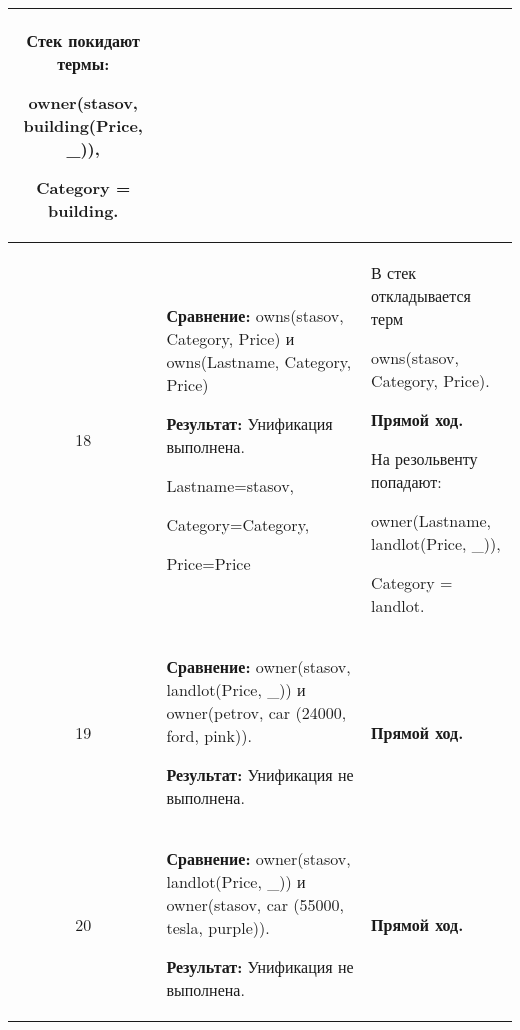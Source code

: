 \begin{longtable}{|c|p{}|p{}|}
  Стек покидают термы:

    owner(stasov, building(Price, \_)),

    Category = building.
                       \\ \hline

18
                       &
\textbf{Сравнение:}\newline
  owns(stasov, Category, Price)
  \newline{}и\newline
  owns(Lastname, Category, Price)
  \newline

  \textbf{Результат:}\newline
  Унификация выполнена.

  Lastname=stasov,

  Category=Category,

  Price=Price
                       &
  В стек откладывается терм

  owns(stasov, Category, Price).
  \newline

  \textbf{Прямой ход.}
  \newline

  На резольвенту попадают:

    owner(Lastname, landlot(Price, \_)),

    Category = landlot.
                       \\ \hline

19
                       &
\textbf{Сравнение:}\newline
  owner(stasov, landlot(Price, \_))
  \newline{}и\newline
  owner(petrov, car     (24000,    ford,    pink)).
  \newline

  \textbf{Результат:}\newline
  Унификация не выполнена.
                       &
  \textbf{Прямой ход.}
                       \\ \hline

20
                       &
\textbf{Сравнение:}\newline
  owner(stasov, landlot(Price, \_))
  \newline{}и\newline
  owner(stasov, car     (55000,    tesla,    purple)).
  \newline

  \textbf{Результат:}\newline
  Унификация не выполнена.
                       &
  \textbf{Прямой ход.}
                       \\ \hline


\end{longtable}
